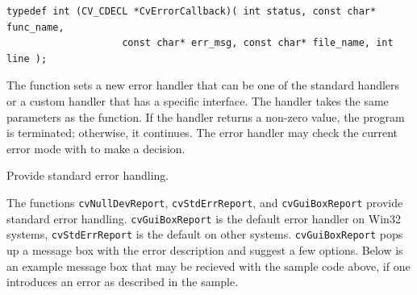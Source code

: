 \begin{lstlisting}
typedef int (CV_CDECL *CvErrorCallback)( int status, const char* func_name,
                    const char* err_msg, const char* file_name, int line );
\end{lstlisting}

The function sets a new error handler that
can be one of the standard handlers or a custom handler
that has a specific interface. The handler takes the same parameters
as the  function. If the handler returns a non-zero value, the
program is terminated; otherwise, it continues. The error handler may
check the current error mode with  to make a decision.


\label{cvNulDevReport}
\label{cvStdErrReport}
\label{cvGuiBoxReport}

Provide standard error handling.


\begin{description}
\end{description}

The functions \texttt{cvNullDevReport}, \texttt{cvStdErrReport},
and \texttt{cvGuiBoxReport} provide standard error
handling. \texttt{cvGuiBoxReport} is the default error
handler on Win32 systems, \texttt{cvStdErrReport} is the default on other
systems. \texttt{cvGuiBoxReport} pops up a message box with the error
description and suggest a few options. Below is an example message box
that may be recieved with the sample code above, if one introduces an
error as described in the sample.

